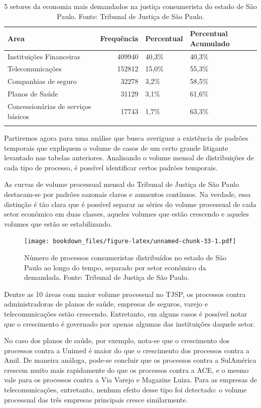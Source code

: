 \documentclass[]{report}
\begin{document}
\begin{longtable}{lrll}
\caption{5 setores da economia mais demandados na justiça consumerista do estado de São Paulo. Fonte: Tribunal de Justiça de São Paulo.} \\
  \hline
Area & Frequência & Percentual & Percentual Acumulado \\
  \hline
Instituições
Financeiras & 409940 & 40,3\% & 40,3\% \\
  Telecomunicações & 152812 & 15,0\% & 55,3\% \\
  Companhias de
seguro & 32278 & 3,2\% & 58,5\% \\
  Planos de Saúde & 31129 & 3,1\% & 61,6\% \\
  Concessionárias
de serviços
básicos & 17743 & 1,7\% & 63,3\% \\
   \hline
\hline
\label{unnamed-chunk-32}
\end{longtable}

Partiremos agora para uma análise que busca averiguar a existência de
padrões temporais que expliquem o volume de casos de um certo grande
litigante levantado nas tabelas anteriores. Analisando o volume mensal
de distribuições de cada tipo de processo, é possível identificar certos
padrões temporais.

As curvas de volume processual mensal do Tribunal de Justiça de São
Paulo destacam-se por padrões sazonais claros e aumentos contínuos. Na
verdade, essa distinção é tão clara que é possível separar as séries do
volume processual de cada setor econômico em duas classes, aqueles
volumes que estão crescendo e aqueles volumes que estão se
estabilizando.

\begin{figure}[htbp]
\centering
\texttt{[image: bookdown\_files/figure-latex/unnamed-chunk-33-1.pdf]}
\caption{\label{fig:unnamed-chunk-33}Número de processos consumeristas
distribuídos no estado de São Paulo ao longo do tempo, separado por
setor econômico da demandada. Fonte: Tribunal de Justiça de São Paulo.}
\end{figure}

Dentre as 10 áreas com maior volume processual no TJSP, os processos
contra administradoras de planos de saúde, empresas de seguros, varejo e
telecomunicações estão crescendo. Entretanto, em alguns casos é possível
notar que o crescimento é governado por apenas algumas das instituições
daquele setor.

No caso dos planos de saúde, por exemplo, nota-se que o crescimento dos
processos contra a Unimed é maior do que o crescimento dos processos
contra a Amil. De maneira análoga, pode-se concluir que os processos
contra a SulAmérica crescem muito mais rapidamente do que os processos
contra a ACE, e o mesmo vale para os processos contra a Via Varejo e
Magazine Luiza. Para as empresas de telecomunicações, entretanto, nenhum
efeito desse tipo foi detectado: o volume processual das três empresas
principais cresce similarmente.
\end{document}
